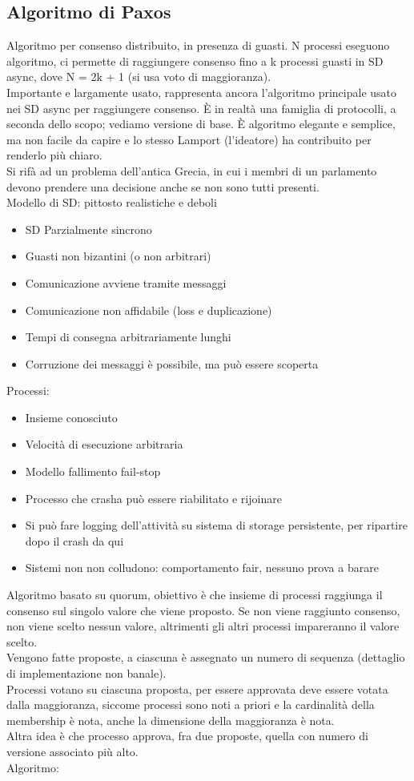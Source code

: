 \documentclass{article}
\begin{document}
\subsection{Algoritmo di Paxos}
Algoritmo per consenso distribuito, in presenza di guasti. N processi eseguono algoritmo, ci permette di raggiungere consenso fino a k processi guasti in SD async, dove N = 2k + 1 (si usa voto di maggioranza).\\ Importante e largamente usato, rappresenta ancora l'algoritmo principale usato nei SD async per raggiungere consenso. È in realtà una famiglia di protocolli, a seconda dello scopo; vediamo versione di base. È algoritmo elegante e semplice, ma non facile da capire e lo stesso Lamport (l'ideatore) ha contribuito per renderlo più chiaro.\\ Si rifà ad un problema dell'antica Grecia, in cui i membri di un parlamento devono prendere una decisione anche se non sono tutti presenti.\\ Modello di SD:
pittosto realistiche e deboli
\begin{itemize}
\item SD Parzialmente sincrono
\item Guasti non bizantini (o non arbitrari)
\item Comunicazione avviene tramite messaggi
\item Comunicazione non affidabile (loss e duplicazione)
\item Tempi di consegna arbitrariamente lunghi
\item Corruzione dei messaggi è possibile, ma può essere scoperta
\end{itemize}
Processi:
\begin{itemize}
\item Insieme conosciuto
\item Velocità di esecuzione arbitraria
\item Modello fallimento fail-stop
\item Processo che crasha può essere riabilitato e rijoinare 
\item Si può fare logging dell'attività su sistema di storage persistente, per ripartire dopo il crash da qui
\item Sistemi non non colludono: comportamento fair, nessuno prova a barare
\end{itemize}
Algoritmo basato su quorum, obiettivo è che insieme di processi raggiunga il consenso sul singolo valore che viene proposto. Se non viene raggiunto consenso, non viene scelto nessun valore, altrimenti gli altri  processi impareranno il valore scelto.\\ Vengono fatte proposte, a ciascuna è assegnato un numero di sequenza (dettaglio di implementazione non banale).\\ Processi votano su ciascuna proposta, per essere approvata deve essere votata dalla maggioranza, siccome processi sono noti a priori e la cardinalità della membership è nota, anche la dimensione della maggioranza è nota.\\ Altra idea è che processo approva, fra due proposte, quella con numero di versione associato più alto.\\ Algoritmo:
\end{document}
